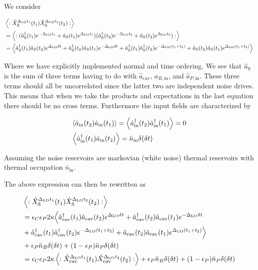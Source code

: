 \documentclass[12pt]{article}
\begin{document}
We consider

\begin{align}
&\Braket{:\hat{X}_{\text{S}}^{\Delta_{\text{LO}}t_1}(t_1)\hat{X}_{\text{S}}^{\Delta_{\text{LO}}t_2}(t_2) :}\\
&=\Braket{:(\hat{a}^{\dag}_{\text{S}}(t_1) e^{-\Delta_{\text{LO}}t_1} + \hat{a}_{\text{S}}(t_1) e^{\Delta_{\text{LO}}t_1})(\hat{a}^{\dag}_{\text{S}}(t_2) e^{-\Delta_{\text{LO}}t_2} + \hat{a}_{\text{S}}(t_2) e^{\Delta_{\text{LO}}t_2}) :}\\
&= \Braket{\hat{a}^{\dag}_{\text{S}}(t_1)\hat{a}_{\text{S}}(t_2)e^{\Delta_{\text{LO}}\delta t} + \hat{a}^{\dag}_{\text{S}}(t_2)\hat{a}_{\text{S}}(t_1)e^{-\Delta_{\text{LO}}\delta t} + \hat{a}^{\dag}_{\text{S}}(t_1)\hat{a}^{\dag}_{\text{S}}(t_2)e^{-\Delta_{\text{LO}}(t_1+t_2)} + \hat{a}_{\text{S}}(t_2)\hat{a}_{\text{S}}(t_1)e^{\Delta_{\text{LO}}(t_1+t_2)}  }
\end{align}

Where we have explicitly implemented normal and time ordering.
We see that $\hat{a}_{\text{S}}$ is the sum of three terms having to do with $\hat{a}_{\text{cav}}$, $\hat{a}_{B,\text{in}}$, and $\hat{a}_{P,\text{in}}$. These three terms should all be uncorrelated since the latter two are independent noise drives. This means that when we take the products and expectations in the last equation there should be no cross terms. Furthermore the input fields are characterized by

\begin{align}
&\Braket{\hat{a}_{\text{in}}(t_2)\hat{a}_{\text{in}}(t_1)} = \Braket{\hat{a}^{\dag}_{\text{in}}(t_2)\hat{a}^{\dag}_{\text{in}}(t_1)} = 0\\ 
& \Braket{\hat{a}^{\dag}_{\text{in}}(t_1)\hat{a}_{\text{in}}(t_2)} = \bar{n}_{\text{in}} \delta(\delta t)
\end{align}

Assuming the noise reservoirs are markovian (white noise) thermal reservoirs with thermal occupation $\bar{n}_{\text{in}}$.

The above expression can then be rewritten as

\begin{align}
&\Braket{:\hat{X}_{\text{S}}^{\Delta_{\text{LO}}t_1}(t_1)\hat{X}_{\text{S}}^{\Delta_{\text{LO}}t_2}(t_2) :}\\
&=\epsilon_C \epsilon_P 2\kappa \Big \langle \hat{a}^{\dag}_{\text{cav}}(t_1)\hat{a}_{\text{cav}}(t_2)e^{\Delta_{\text{LO}}\delta t} + \hat{a}^{\dag}_{\text{cav}}(t_2)\hat{a}_{\text{cav}}(t_1)e^{-\Delta_{\text{LO}}\delta t}\\
&+ \hat{a}^{\dag}_{\text{cav}}(t_1)\hat{a}^{\dag}_{\text{cav}}(t_2)e^{-\Delta_{\text{LO}}(t_1+t_2)} + \hat{a}_{\text{cav}}(t_2)\hat{a}_{\text{cav}}(t_1)e^{\Delta_{\text{LO}}(t_1+t_2)} \Big \rangle\\
&+\epsilon_P \bar{n}_B\delta(\delta t) + (1-\epsilon_P) \bar{n}_P \delta(\delta t)\\
&= \epsilon_C \epsilon_P 2 \kappa \Braket{:\hat{X}_{\text{cav}}^{\Delta_{\text{LO}}t_1}(t_1)\hat{X}_{\text{cav}}^{\Delta_{\text{LO}}t_2}(t_2) :} +\epsilon_P \bar{n}_B \delta(\delta t) + (1-\epsilon_P) \bar{n}_P \delta(\delta t)
\end{align}
\end{document}
